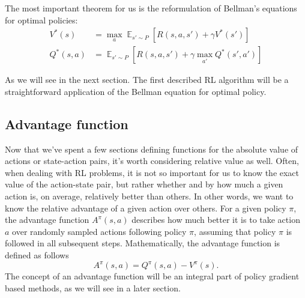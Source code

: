 The most important theorem for us is the reformulation of Bellman's equations for optimal policies:
\begin{align*}
    V^*(s) &= \max_a \mathop{\mathbb{E}}_{s' \sim P} [R(s,a,s') + \gamma V^*(s')] \\
    Q^*(s,a) &= \mathop{\mathbb{E}}_{s' \sim P} [R(s,a,s') + \gamma \max_{a'} Q^*(s',a')]
\end{align*}

As we will see in the next section. 
The first described RL algorithm will be a straightforward application of the Bellman equation for optimal policy.

\subsection*{Advantage function}
Now that we've spent a few sections defining functions for the absolute value of actions or state-action pairs, it's worth considering relative value as well.
Often, when dealing with RL problems, it is not so important for us to know the exact value of the action-state pair, but rather whether and by how much a given action is, on average, relatively better than others.
In other words, we want to know the relative advantage of a given action over others.
For a given policy $\pi$, the advantage function $A^\pi(s,a)$ describes how much better it is to take action $a$ over randomly sampled actions following policy $\pi$, assuming that policy $\pi$ is followed in all subsequent steps.
Mathematically, the advantage function is defined as follows
$$A^\pi(s,a) = Q^\pi(s,a) - V^\pi(s).$$
The concept of an advantage function will be an integral part of policy gradient based methods, as we will see in a later section.




